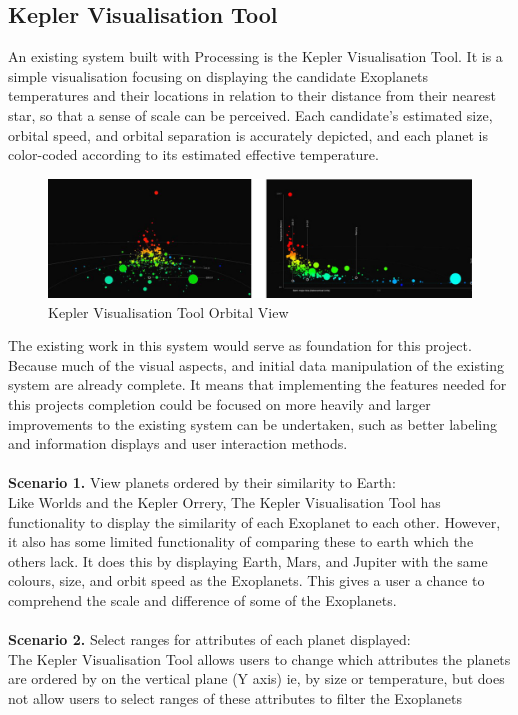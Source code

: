\subsection{Kepler Visualisation Tool}
An existing system built with Processing is the Kepler Visualisation
Tool\cite{kepler_github, kepler_article}. It is a simple visualisation focusing
on displaying the candidate Exoplanets temperatures and their locations in
relation to their distance from their nearest star, so that a sense of scale can
be perceived. Each candidate’s estimated size, orbital speed, and orbital
separation is accurately depicted, and each planet is color-coded according to
its estimated effective temperature.
\begin{figure}[H]
  \centering
      \includegraphics[width=1\textwidth]{images/kepler.jpg}
  \caption{Kepler Visualisation Tool Orbital View}
\end{figure}
The existing work in this system would serve as foundation for this project.
Because much of the visual aspects, and initial data manipulation of the
existing system are already complete. It means that implementing the features
needed for this projects completion could be focused on more heavily and larger
improvements to the existing system can be undertaken, such as better labeling
and information displays and user interaction methods.
\\\\
{\bf Scenario 1.} View planets ordered by their similarity to Earth:\\
Like Worlds and the Kepler Orrery, The Kepler Visualisation Tool has
functionality to display the similarity of each Exoplanet to each other.
However, it also has some limited functionality of comparing these to earth
which the others lack. It does this by displaying Earth, Mars, and Jupiter with
the same colours, size, and orbit speed as the Exoplanets. This gives a user a
chance to comprehend the scale and difference of some of the Exoplanets.
\\\\
{\bf Scenario 2.} Select ranges for attributes of each planet displayed:\\
The Kepler Visualisation Tool allows users to change which attributes the
planets are ordered by on the vertical plane (Y axis) ie, by size or
temperature, but does not allow users to select ranges of these attributes to
filter the Exoplanets

